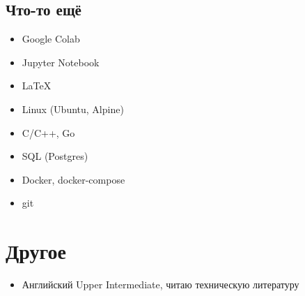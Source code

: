 \documentclass{article}
\begin{document}
\begin{multicols}{2}
            \subsection{Что-то ещё}
            \begin{itemize}
                \item Google Colab
                \item Jupyter Notebook
                \item \LaTeX{}
                \item Linux (Ubuntu, Alpine)
                \item C/C++, Go
                \item SQL (Postgres)
                \item Docker, docker-compose
                \item git
            \end{itemize}

    \end{multicols}
    \section{Другое}
        \begin{itemize}
            \item Английский Upper Intermediate, читаю техническую литературу
        \end{itemize}
\end{document}
